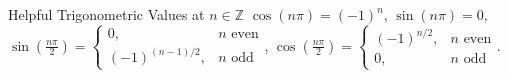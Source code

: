 \begin{formulabox}{Helpful Trigonometric Values at $n \in \mathbb{Z}$}
$\cos(n\pi) = (-1)^n$, $\sin(n\pi) = 0$, $\sin\left(\frac{n\pi}{2}\right) = \begin{cases} 0, & n \text{ even} \\ (-1)^{(n-1)/2}, & n \text{ odd} \end{cases}$, $\cos\left(\frac{n\pi}{2}\right) = \begin{cases} (-1)^{n/2}, & n \text{ even} \\ 0, & n \text{ odd} \end{cases}$.
\end{formulabox}
